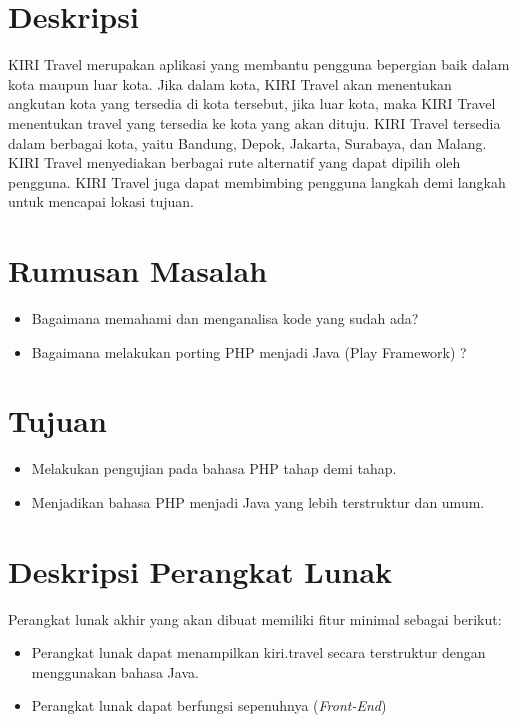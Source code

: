 \documentclass[a4paper,twoside]{article}
\begin{document}
\title{\@judultopik}
\author{\nama \textendash \@npm} 

\newcommand{\nama}{Steven Sutana}
\newcommand{\@npm}{2012730046}
\newcommand{\@judultopik}{Porting PHP menjadi Play Framework (KIRI \textit{Front-End})} %
\newcommand{\jumpemb}{1} %
\newcommand{\tanggal}{26/08/2015}
\maketitle


\section{Deskripsi}
KIRI Travel merupakan aplikasi yang membantu pengguna bepergian baik dalam kota maupun luar kota. Jika dalam kota, KIRI Travel akan menentukan angkutan kota yang tersedia di kota tersebut, jika luar kota, maka KIRI Travel menentukan travel yang tersedia ke kota yang akan dituju. KIRI Travel tersedia dalam berbagai kota, yaitu Bandung, Depok, Jakarta, Surabaya, dan Malang. KIRI Travel menyediakan berbagai rute alternatif yang dapat dipilih oleh pengguna. KIRI Travel juga dapat membimbing pengguna langkah demi langkah untuk mencapai lokasi tujuan. 


\section{Rumusan Masalah}
\begin{itemize}
	\item Bagaimana memahami dan menganalisa kode yang sudah ada?
	\item Bagaimana melakukan porting PHP menjadi Java (Play Framework) ?
\end{itemize}

\section{Tujuan}
\begin{itemize}
	\item Melakukan pengujian pada bahasa PHP tahap demi tahap.
	\item Menjadikan bahasa PHP menjadi Java yang lebih terstruktur dan umum.
\end{itemize}

\section{Deskripsi Perangkat Lunak}
Perangkat lunak akhir yang akan dibuat memiliki fitur minimal sebagai berikut:
\begin{itemize}
	\item Perangkat lunak dapat menampilkan kiri.travel secara terstruktur dengan menggunakan bahasa Java.
	\item Perangkat lunak dapat berfungsi sepenuhnya (\textit{Front-End})
\end{itemize}
\end{document}
